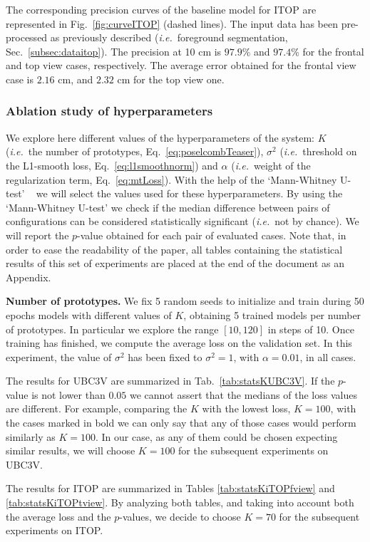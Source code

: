 \documentclass[review,12pt,3p]{elsarticle}
\def \ie{\textit{i.e.}}
\newcommand{\myparagraph}[1]{\noindent \textbf{#1}}
\begin{document}
The corresponding precision curves of the baseline model for ITOP are represented in Fig.~\ref{fig:curveITOP} (dashed lines). The input data has been pre-processed as previously described (\ie~foreground segmentation, Sec.~\ref{subsec:dataitop}). 
The precision at 10 cm is $97.9$\% and $97.4$\% for the frontal and top view cases, respectively.
The average error obtained for the frontal view case is $2.16$ cm, and $2.32$ cm for the top view one. 

\subsubsection{Ablation study of hyperparameters}
We explore here different values of the hyperparameters of the system: $K$ (\ie~the number of prototypes, Eq.~\ref{eq:poselcombTeaser}), $\sigma^2$ (\ie~threshold on the L1-smooth loss, Eq.~\ref{eq:l1smoothnorm}) and $\alpha$ (\ie~weight of the regularization term, Eq.~\ref{eq:mtLoss}).
With the help of the `Mann-Whitney U-test' ~\cite{MannWhitney1947test} we will select the values used for these hyperparameters.
By using the `Mann-Whitney U-test' we check if the median difference between pairs of configurations can be considered statistically significant (\ie~not by chance). We will report the $p$-value obtained for each pair of evaluated cases.
Note that, in order to ease the readability of the paper, all tables containing the statistical results of this set of experiments are placed at the end of the document as an Appendix.

\myparagraph{Number of prototypes.}
We fix 5 random seeds to initialize and train during 50 epochs models with different values of $K$, obtaining 5 trained models per number of prototypes.
In particular we explore the range $\left[10,120\right]$ in steps of 10.
Once training has finished, we compute the average loss on the validation set. 
In this experiment, the value of $\sigma^2$ has been fixed to $\sigma^2=1$, with $\alpha=0.01$, in all cases.


The results for UBC3V are summarized in Tab.~\ref{tab:statsKUBC3V}. If the $p$-value is not lower than $0.05$ we cannot assert that the medians of the loss values are different. For example, comparing the $K$ with the lowest loss, $K=100$, with the cases marked in bold we can only say that any of those cases would perform similarly as $K=100$. In our case, as any of them could be chosen expecting similar results, we will choose $K=100$ for the subsequent experiments on UBC3V.

The results for ITOP are summarized in Tables \ref{tab:statsKiTOPfview} and \ref{tab:statsKiTOPtview}. By analyzing both tables, and taking into account both the average loss and the $p$-values, we decide to choose $K=70$ for the subsequent experiments on ITOP.
\end{document}

